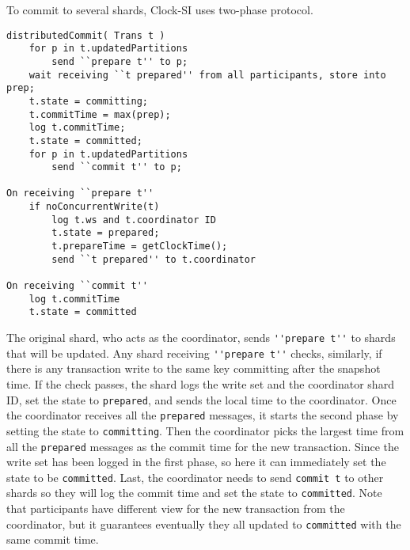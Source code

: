 To commit to several shards,
Clock-SI uses two-phase protocol.
\begin{lstlisting}[caption={Distributed Commit},label={lst:clock-si-distributed-commit}]
distributedCommit( Trans t )
    for p in t.updatedPartitions
        send ``prepare t'' to p;
    wait receiving ``t prepared'' from all participants, store into prep;
    t.state = committing;
    t.commitTime = max(prep);
    log t.commitTime;
    t.state = committed;
    for p in t.updatedPartitions
        send ``commit t'' to p;

On receiving ``prepare t''
    if noConcurrentWrite(t)
        log t.ws and t.coordinator ID
        t.state = prepared;
        t.prepareTime = getClockTime();
        send ``t prepared'' to t.coordinator

On receiving ``commit t''
    log t.commitTime
    t.state = committed
\end{lstlisting}
The original shard, who acts as the coordinator,
sends \verb|''prepare t''| to shards that will be updated.
Any shard receiving \verb|''prepare t''| checks, similarly, 
if there is any transaction write to the same key committing after the snapshot time.
If the check passes, 
the shard logs the write set and the coordinator shard ID,
set the state to \verb|prepared|,
and sends the local time to the coordinator.
Once the coordinator receives all the \verb|prepared| messages,
it starts the second phase by setting the state to \verb|committing|.
Then the coordinator picks the largest time from 
all the \verb|prepared| messages as the commit time for the new transaction.
Since the write set has been logged in the first phase, 
so here it can immediately set the state to be \verb|committed|.
Last, the coordinator needs to send \verb|commit t| to other shards 
so they will log the commit time and set the state to \verb|committed|.
Note that participants have different view for the new transaction from the coordinator,
but it guarantees eventually they all updated to \verb|committed| with the same commit time.

